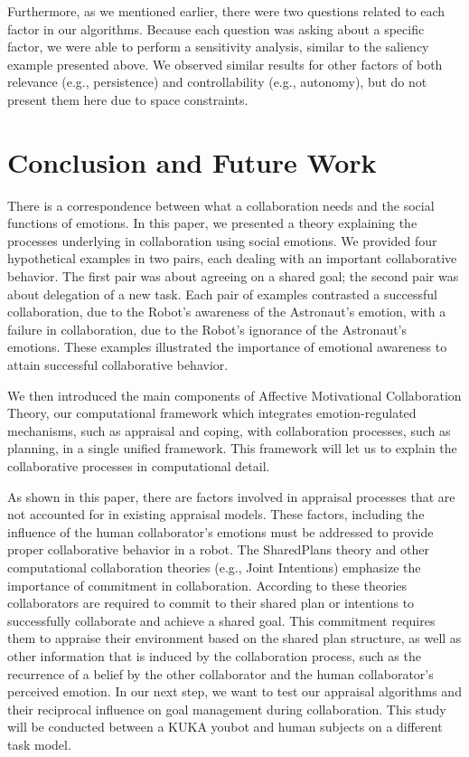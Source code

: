 Furthermore, as we mentioned earlier, there were two questions related to each
factor in our algorithms. Because each question was asking about a specific
factor, we were able to perform a sensitivity analysis, similar to the saliency
example presented above. We observed similar results for other factors of both
relevance (e.g., persistence) and controllability (e.g., autonomy), but do not
present them here due to space constraints.

\section{Conclusion and Future Work}

There is a correspondence between what a collaboration needs and the social
functions of emotions. In this paper, we presented a theory explaining the
processes underlying in collaboration using social emotions. We provided four
hypothetical examples in two pairs, each dealing with an important collaborative
behavior. The first pair was about agreeing on a shared goal; the second pair
was about delegation of a new task. Each pair of examples contrasted a
successful collaboration, due to the Robot's awareness of the Astronaut's
emotion, with a failure in collaboration, due to the Robot's ignorance of the
Astronaut's emotions. These examples illustrated the importance of
emotional awareness to attain successful collaborative behavior.

We then introduced the main components of Affective Motivational Collaboration
Theory, our computational framework which integrates emotion-regulated
mechanisms, such as appraisal and coping, with collaboration processes, such as
planning, in a single unified framework. This framework will let us to explain
the collaborative processes in computational detail.

As shown in this paper, there are factors involved in appraisal processes
that are not accounted for in existing appraisal models. These factors,
including the influence of the human collaborator's emotions must be addressed
to provide proper collaborative behavior in a robot. The SharedPlans theory and
other computational collaboration theories (e.g., Joint Intentions) emphasize
the importance of commitment in collaboration. According to these theories
collaborators are required to commit to their shared plan or intentions to
successfully collaborate and achieve a shared goal. This commitment requires
them to appraise their environment based on the shared plan structure, as well
as other information that is induced by the collaboration process, such as the
recurrence of a belief by the other collaborator and the human collaborator's
perceived emotion. In our next step, we want to test our appraisal algorithms
and their reciprocal influence on goal management during collaboration. This
study will be conducted between a KUKA youbot and human subjects on a different
task model.

